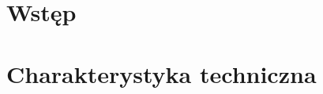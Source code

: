 \documentclass[
12pt, %
a4paper, %
oneside, %
]{article}
\begin{document}


    \tableofcontents
    \section{Wstęp}
    
    
    

    \section{Charakterystyka techniczna}
    
    
    

    
     
\end{document}

